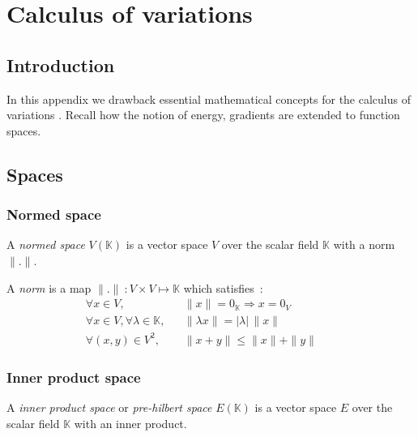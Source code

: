 
\newrefsegment
\chapter{Calculus of variations}\label{chp=variation}

\section{Introduction}
In this appendix we drawback essential mathematical concepts for the calculus of variations \cite{Abraham2002}.
Recall how the notion of energy, gradients are extended to function spaces.


\section{Spaces}

\subsection{Normed space}
A \emph{normed space} $V(\mathbb{K})$ is a vector space $V$ over the scalar field $\mathbb{K}$ with a norm $\|.\|$.

A \emph{norm} is a map $\| . \|~: V \times V \longmapsto \mathbb{K}$ which satisfies~:
\begin{subequations}
\begin{align}
	&\forall x \in V, 							&& \|x\| = 0_\mathbb{K} \Rightarrow x = 0_V&&&\\
	&\forall x \in V, \forall \lambda \in \mathbb{K}, 	&& \|\lambda x\| = |\lambda| \,\|x\|&&&\\
	&\forall (x,y) \in V^2, 						&& \|x + y\| \leqslant \|x\| + \|y\|&&&
\end{align}
\end{subequations}


\subsection{Inner product space}
A \emph{inner product space} or \emph{pre-hilbert space} $E(\mathbb{K})$ is a vector space $E$ over the scalar field $\mathbb{K}$ with an inner product.

